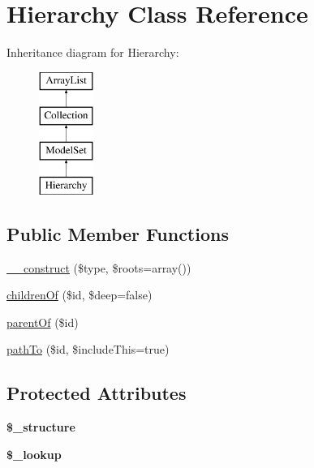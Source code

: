 \hypertarget{classHierarchy}{
\section{Hierarchy Class Reference}
\label{classHierarchy}
}
Inheritance diagram for Hierarchy:\begin{figure}[H]
\begin{center}
\leavevmode
\includegraphics[height=4.000000cm]{classHierarchy}
\end{center}
\end{figure}
\subsection*{Public Member Functions}
\begin{DoxyCompactItemize}
\item 
\hyperlink{classHierarchy_a6bd1635911af5bd6472b060f177c841a}{\_\-\_\-construct} (\$type, \$roots=array())
\item 
\hyperlink{classHierarchy_a51c0b25ea641b1de5c72dca9a8a992c5}{childrenOf} (\$id, \$deep=false)
\item 
\hyperlink{classHierarchy_a7334e9be19629ef54f19e71ed3cf413b}{parentOf} (\$id)
\item 
\hyperlink{classHierarchy_ad54d88d65797331b1e6aebdd2a61c23b}{pathTo} (\$id, \$includeThis=true)
\end{DoxyCompactItemize}
\subsection*{Protected Attributes}
\begin{DoxyCompactItemize}
\item 
\hypertarget{classHierarchy_a8e4a8dea319d86aa81f82b0526be4bcc}{
{\bfseries \$\_\-structure}}
\label{classHierarchy_a8e4a8dea319d86aa81f82b0526be4bcc}

\item 
\hypertarget{classHierarchy_a92e8aa798f924f01a4cf4bd98dc56908}{
{\bfseries \$\_\-lookup}}
\label{classHierarchy_a92e8aa798f924f01a4cf4bd98dc56908}

\end{DoxyCompactItemize}



